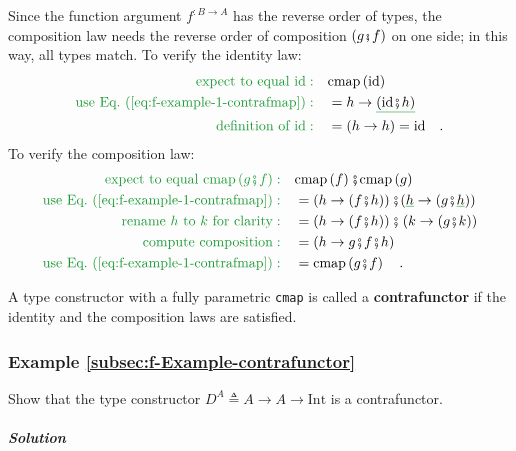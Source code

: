 \noindent Since the function argument $f^{:B\rightarrow A}$ has the
reverse order of types, the composition law needs the reverse order
of composition $\left(g\bef f\right)$ on one side; in this way, all
types match. To verify the identity law:
\begin{align*}
{\color{greenunder}\text{expect to equal }\text{id}:}\quad & \text{cmap}\left(\text{id}\right)\\
{\color{greenunder}\text{use Eq.~(\ref{eq:f-example-1-contrafmap})}:}\quad & =h\rightarrow\gunderline{(\text{id}\bef h)}\\
{\color{greenunder}\text{definition of }\text{id}:}\quad & =\left(h\rightarrow h\right)=\text{id}\quad.
\end{align*}
To verify the composition law:
\begin{align*}
{\color{greenunder}\text{expect to equal }\text{cmap}\left(g\bef f\right):}\quad & \text{cmap}\left(f\right)\bef\text{cmap}\left(g\right)\\
{\color{greenunder}\text{use Eq.~(\ref{eq:f-example-1-contrafmap})}:}\quad & =\left(h\rightarrow(f\bef h)\right)\bef(\gunderline h\rightarrow(g\bef\gunderline h))\\
{\color{greenunder}\text{rename }h\text{ to }k\text{ for clarity}:}\quad & =\left(h\rightarrow(f\bef h)\right)\bef\left(k\rightarrow(g\bef k)\right)\\
{\color{greenunder}\text{compute composition}:}\quad & =\left(h\rightarrow g\bef f\bef h\right)\\
{\color{greenunder}\text{use Eq.~(\ref{eq:f-example-1-contrafmap})}:}\quad & =\text{cmap}\left(g\bef f\right)\quad.
\end{align*}

A type constructor with a fully parametric \lstinline!cmap! is called
a \textbf{contrafunctor} if the identity and
the composition laws are satisfied.

\subsubsection{Example \label{subsec:f-Example-contrafunctor}\ref{subsec:f-Example-contrafunctor}}

Show that the type constructor $D^{A}\triangleq A\rightarrow A\rightarrow\text{Int}$
is a contrafunctor.

\subparagraph{Solution}

